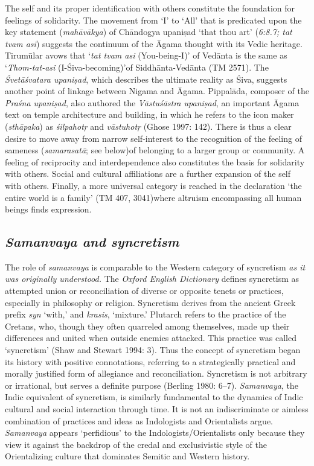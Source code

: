 The self and its proper identification with others constitute the foundation for feelings of solidarity. The movement from ‘I’ to ‘All’ that is predicated upon the key statement (\textit{mahāvākya}) of Chāndogya upaniṣad ‘that thou art’ (\textit{6:8.7; tat tvam asi}) suggests the continuum of the Āgama thought with its Vedic heritage. Tirumūlar avows that ‘\textit{tat tvam asi} (You-being-I)’ of Vedānta is the same as ‘\textit{Thom-tat-asi} (I-Śiva-becoming)’of Siddhānta-Vedānta (TM 2571). The \textit{Śvetāśvatara upaniṣad}, which describes the ultimate reality as Śiva, suggests another point of linkage between Nigama and Āgama. Pippalāda, composer of the \textit{Praśna upaniṣad}, also authored the \textit{Vāstuśāstra upaniṣad}, an important Āgama text on temple architecture and building, in which he refers to the icon maker (\textit{sthāpaka}) as \textit{śilpahotṛ} and \textit{vāstuhotṛ} (Ghose 1997: 142). There is thus a clear desire to move away from narrow self-interest to the recognition of the feeling of sameness (\textit{samarasatā}; see below)of belonging to a larger group or community. A feeling of reciprocity and interdependence also constitutes the basis for solidarity with others. Social and cultural affiliations are a further expansion of the self with others. Finally, a more universal category is reached in the declaration ‘the entire world is a family’ (TM 407, 3041)where altruism encompassing all human beings finds expression.


\subsection*{\textit{Samanvaya and syncretism}}

The role of \textit{samanvaya} is comparable to the Western category of syncretism \textit{as it was originally understood.} The \textit{Oxford English Dictionary} defines syncretism as attempted union or reconciliation of diverse or opposite tenets or practices, especially in philosophy or religion. Syncretism derives from the ancient Greek prefix \textit{syn} ‘with,’ and \textit{krasis}, ‘mixture.’ Plutarch refers to the practice of the Cretans, who, though they often quarreled among themselves, made up their differences and united when outside enemies attacked. This practice was called ‘syncretism’ (Shaw and Stewart 1994: 3). Thus the concept of syncretism began its history with positive connotations, referring to a strategically practical and morally justified form of allegiance and reconciliation. Syncretism is not arbitrary or irrational, but serves a definite purpose (Berling 1980: 6–7). \textit{Samanvaya}, the Indic equivalent of syncretism, is similarly fundamental to the dynamics of Indic cultural and social interaction through time. It is not an indiscriminate or aimless combination of practices and ideas as Indologists and Orientalists argue. \textit{Samanvaya} appears ‘perfidious’ to the Indologists/Orientalists only because they view it against the backdrop of the credal and exclusivistic style of the Orientalizing culture that dominates Semitic and Western history.


